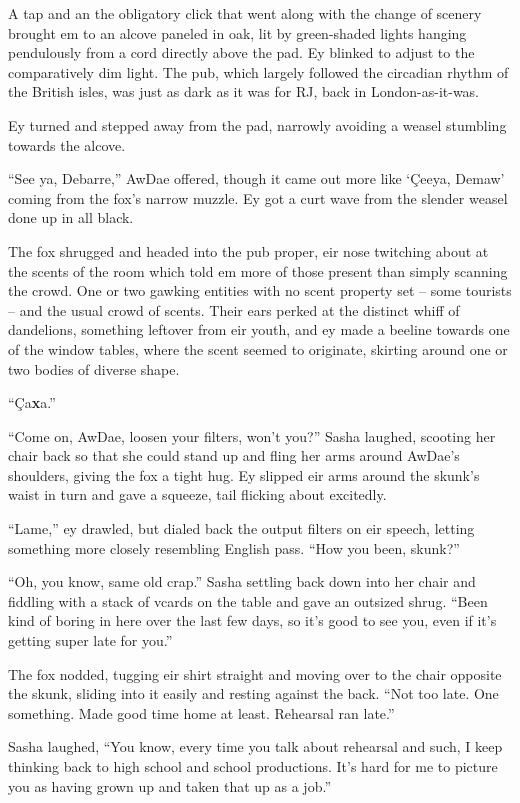 A tap and an the obligatory click that went along with the change of scenery brought em to an alcove paneled in oak, lit by green-shaded lights hanging pendulously from a cord directly above the pad.  Ey blinked to adjust to the comparatively dim light.  The pub, which largely followed the circadian rhythm of the British isles, was just as dark as it was for RJ, back in London-as-it-was.

Ey turned and stepped away from the pad, narrowly avoiding a weasel stumbling towards the alcove.

``See ya, Debarre,'' AwDae offered, though it came out more like `\c{C}eeya, Demaw' coming from the fox's narrow muzzle.  Ey got a curt wave from the slender weasel done up in all black.

The fox shrugged and headed into the pub proper, eir nose twitching about at the scents of the room which told em more of those present than simply scanning the crowd.  One or two gawking entities with no scent property set -- some tourists -- and the usual crowd of scents.  Their ears perked at the distinct whiff of dandelions, something leftover from eir youth, and ey made a beeline towards one of the window tables, where the scent seemed to originate, skirting around one or two bodies of diverse shape.

``\c{C}a\textbf{x}a.''

``Come on, AwDae, loosen your filters, won't you?'' Sasha laughed, scooting her chair back so that she could stand up and fling her arms around AwDae's shoulders, giving the fox a tight hug.  Ey slipped eir arms around the skunk's waist in turn and gave a squeeze, tail flicking about excitedly.

``Lame,'' ey drawled, but dialed back the output filters on eir speech, letting something more closely resembling English pass.  ``How you been, skunk?''

``Oh, you know, same old crap.''  Sasha settling back down into her chair and fiddling with a stack of vcards on the table and gave an outsized shrug.  ``Been kind of boring in here over the last few days, so it's good to see you, even if it's getting super late for you.''

The fox nodded, tugging eir shirt straight and moving over to the chair opposite the skunk, sliding into it easily and resting against the back.  ``Not too late.  One something.  Made good time home at least.  Rehearsal ran late.''

Sasha laughed, ``You know, every time you talk about rehearsal and such, I keep thinking back to high school and school productions.  It's hard for me to picture you as having grown up and taken that up as a job.''

